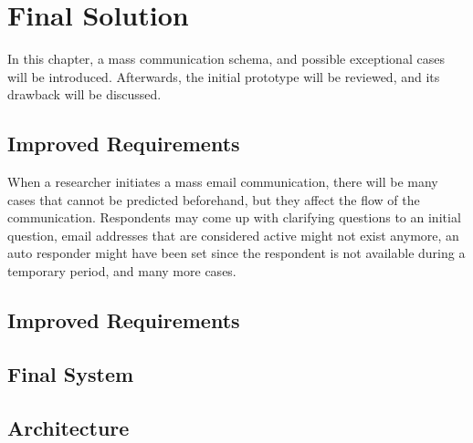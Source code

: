 \chapter{Final Solution}
\label{chp:5:FinaSolu}
In this chapter, a mass communication schema, and possible exceptional cases will be introduced. Afterwards, the initial prototype will be reviewed, and its drawback will be discussed.

\section{Improved Requirements}
\label{sec:5.1:ImprRequ}

When a researcher initiates a mass email communication, there will be many cases that cannot be predicted beforehand, but they affect the flow of the communication. Respondents may come up with clarifying questions to an initial question, email addresses that are considered active might not exist anymore, an auto responder might have been set since the respondent is not available during a temporary period, and many more cases.

\section{Improved Requirements}
\label{sec:5.1:ImprRequ}

\section{Final System}
\label{sec:5.2:FinaSyst}

\section{Architecture}
\label{sec:5.3:FinaArch}



\begin{comment}
Requirements'dan once urunu tanit screenshot'larla cunku cok zaman kaybedecen


write first about the revised requirements,
then describe the product with pictures,
then some technical details

\section{Product}
\label{sec:5.1:FinaProd}

\subsection{Improved Requirements}
\label{subsec:5.1.1:Cust}

\subsection{Final System}
\label{subsec:5.1.2:FinaSyst}

\subsection{Architecture}
\label{subsec:5.1.3:FinaArch}

\end{comment}
